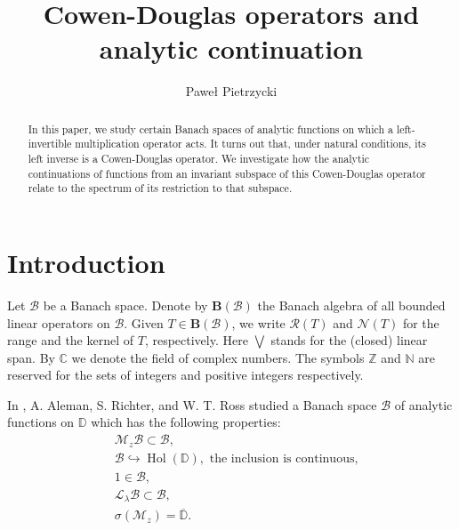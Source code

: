 \documentclass[reqno]{amsproc}
\DeclareMathOperator{\hol}{Hol}
\numberwithin{equation}{section}
\theoremstyle{remark}
\newcommand*{\hh}{\mathcal{H}}
\newcommand*{\nul}{\mathscr{N}}
\newcommand*{\bou}{\boldsymbol{B}}
\newcommand{\disc}{\mathbb{D}}
\theoremstyle{definition}
\newcommand{\lein}{\mathcal{L}}
\newcommand{\mul}{\mathcal{M}_z}
\newcommand{\bspace}{\mathcal{B}}
\newcommand*{\ran}{\mathscr{R}}
\begin{document}
   \title[Cowen-Douglas operators and analytic Continuation] {Cowen-Douglas operators and analytic continuation}
\author[P. Pietrzycki ]{Pawe{\l} Pietrzycki}



   \address{Wydzia{\l} Matematyki i Informatyki, Uniwersytet
Jagiello\'{n}ski, ul. {\L}ojasiewicza 6,
PL-30348 Krak\'{o}w}


 


   \begin{abstract}
 In this paper, we study certain Banach spaces of analytic functions on which a left-invertible multiplication operator acts. It turns out that, under natural conditions, its left inverse is a Cowen-Douglas operator. We investigate how the analytic continuations of functions from an invariant subspace of this Cowen-Douglas operator relate to the spectrum of its restriction to that subspace.
   \end{abstract}

   \maketitle

   \section{Introduction}
 Let $\bspace$ be a Banach space. Denote by $\bou(\bspace)$ the Banach algebra of all bounded linear
 operators on $\bspace$.
Given $T\in\bou(\bspace)$, we write $\ran(T)$ and $\nul(T)$ for the range  and the kernel of $T$, respectively. Here $\bigvee$ stands for the (closed) linear span. By $\mathbb{C}$ we denote the
field of complex
numbers. The
symbols $\mathbb{Z}$ and
$\mathbb{N}$
 are reserved for the sets of integers and
positive integers
respectively. 


In \cite{ARR98},
 A. Aleman, S. Richter, and W. T. Ross studied a Banach space $\bspace$ of analytic functions on $\disc$ which has the following properties:
\begin{align*}
    &\mul \bspace \subset \bspace,\\
    &\bspace \hookrightarrow \hol(\disc), \text{ the inclusion is  
continuous,}\\
& 1\in \bspace,\\
& \lein_\lambda \bspace \subset \bspace,
\\
&\sigma(\mul) = \overline{\disc}\label{warost}.
\end{align*}
\end{document}
